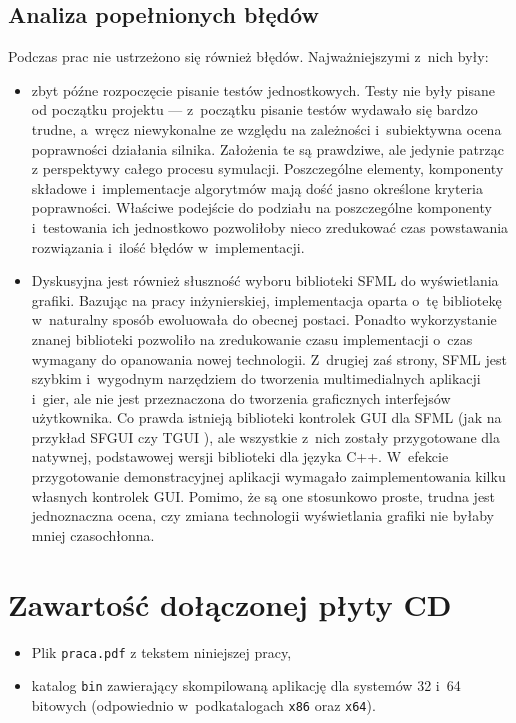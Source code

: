 \section*{Analiza popełnionych błędów}
Podczas prac nie ustrzeżono się również błędów. Najważniejszymi z~nich były: 
\begin{itemize}
	\item zbyt późne rozpoczęcie pisanie testów jednostkowych. Testy nie były pisane od początku projektu --- z~początku pisanie testów wydawało się bardzo trudne, a~wręcz niewykonalne ze względu na zależności i~subiektywna ocena poprawności działania silnika. Założenia te są prawdziwe, ale jedynie patrząc z perspektywy całego procesu symulacji. Poszczególne elementy, komponenty składowe i~implementacje algorytmów mają dość jasno określone kryteria poprawności. Właściwe podejście do podziału na poszczególne komponenty i~testowania ich jednostkowo pozwoliłoby nieco zredukować czas powstawania rozwiązania i~ilość błędów w~implementacji.
	\item Dyskusyjna jest również słuszność wyboru biblioteki SFML do wyświetlania grafiki. Bazując na pracy inżynierskiej, implementacja oparta o~tę bibliotekę w~naturalny sposób ewoluowała do obecnej postaci. Ponadto wykorzystanie znanej biblioteki pozwoliło na zredukowanie czasu implementacji o~czas wymagany do opanowania nowej technologii. Z~drugiej zaś strony, SFML jest szybkim i~wygodnym narzędziem do tworzenia multimedialnych aplikacji i~gier, ale nie jest przeznaczona do tworzenia graficznych interfejsów użytkownika. Co prawda istnieją biblioteki kontrolek GUI dla SFML (jak na przykład SFGUI \cite{bib:sfgui} czy TGUI \cite{bib:tgui}), ale wszystkie z~nich zostały przygotowane dla natywnej, podstawowej wersji biblioteki dla języka C++. W~efekcie przygotowanie demonstracyjnej aplikacji wymagało zaimplementowania kilku własnych kontrolek GUI. Pomimo, że są one stosunkowo proste, trudna jest jednoznaczna ocena, czy zmiana technologii wyświetlania grafiki nie byłaby mniej czasochłonna.
\end{itemize}

\appendix
\chapter{Zawartość dołączonej płyty CD}
\begin{itemize}
	\item Plik \verb|praca.pdf| z tekstem niniejszej pracy,
	\item katalog \verb|bin| zawierający skompilowaną aplikację dla systemów 32 i~64 bitowych (odpowiednio w~podkatalogach \verb|x86| oraz \verb|x64|).
\end{itemize}
